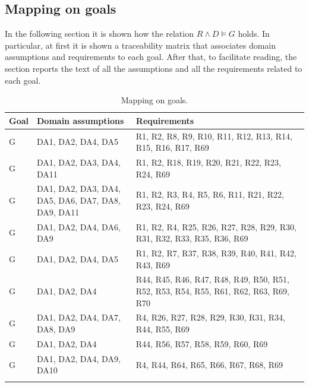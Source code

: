\subsection{Mapping on goals}
\label{subsec: map_on_g}%
In the following section it is shown how the relation $R\land D \models G$ holds.
In particular, at first it is shown a traceability matrix that associates domain assumptions and requirements to each goal.
After that, to facilitate reading, the section reports the text of all the assumptions and all the requirements related to each goal.
\setcounter{mg}{1}
\newcommand{\cmg}{\themg\stepcounter{mg}}
\begin{center}
    \begin{longtable}{|p{0.06\linewidth}|p{0.34\linewidth}|p{0.6\linewidth}|}
        \hline
        \textbf{Goal} & \textbf{Domain assumptions}                       & \textbf{Requirements}                                                               \\
        \hline
        G\cmg         & DA1, DA2, DA4, DA5                                & R1, R2, R8, R9, R10, R11, R12, R13, R14, R15, R16, R17, R69                         \\
        \hline
        G\cmg         & DA1, DA2, DA3, DA4, DA11                          & R1, R2, R18, R19, R20, R21, R22, R23, R24, R69                                      \\
        \hline
        G\cmg         & DA1, DA2, DA3, DA4, DA5, DA6, DA7, DA8, DA9, DA11 & R1, R2, R3, R4, R5, R6, R11, R21, R22, R23, R24, R69                                \\
        \hline
        G\cmg         & DA1, DA2, DA4, DA6, DA9                           & R1, R2, R4, R25, R26, R27, R28, R29, R30, R31, R32, R33, R35, R36, R69              \\
        \hline
        G\cmg         & DA1, DA2, DA4, DA5                                & R1, R2, R7, R37, R38, R39, R40, R41, R42, R43, R69                                  \\
        \hline
        G\cmg         & DA1, DA2, DA4                                     & R44, R45, R46, R47, R48, R49, R50, R51, R52, R53, R54, R55, R61, R62, R63, R69, R70 \\
        \hline
        G\cmg         & DA1, DA2, DA4, DA7, DA8, DA9                      & R4, R26, R27, R28, R29, R30, R31, R34, R44, R55, R69                                \\
        \hline
        G\cmg         & DA1, DA2, DA4                                     & R44, R56, R57, R58, R59, R60, R69                                                   \\
        \hline
        G\cmg         & DA1, DA2, DA4, DA9, DA10                          & R4, R44, R64, R65, R66, R67, R68, R69                                               \\
        \hline
        \caption{Mapping on goals.}
        \label{tab: map_on_g}%
    \end{longtable}
\end{center}

